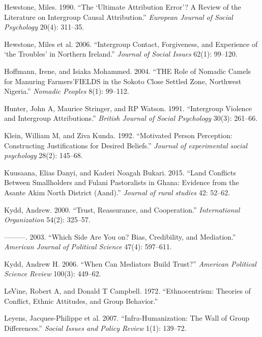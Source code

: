 \documentclass[11pt]{article}
\begin{document}
\leavevmode\hypertarget{ref-hewstone1990ultimate}{}%
Hewstone, Miles. 1990. ``The `Ultimate Attribution Error'? A Review of
the Literature on Intergroup Causal Attribution.'' \emph{European
Journal of Social Psychology} 20(4): 311--35.

\leavevmode\hypertarget{ref-hewstone2006intergroup}{}%
Hewstone, Miles et al. 2006. ``Intergroup Contact, Forgiveness, and
Experience of `the Troubles' in Northern Ireland.'' \emph{Journal of
Social Issues} 62(1): 99--120.

\leavevmode\hypertarget{ref-hoffmann2004role}{}%
Hoffmann, Irene, and Isiaka Mohammed. 2004. ``THE Role of Nomadic Camels
for Manuring Farmers'FIELDS in the Sokoto Close Settled Zone, Northwest
Nigeria.'' \emph{Nomadic Peoples} 8(1): 99--112.

\leavevmode\hypertarget{ref-hunter1991intergroup}{}%
Hunter, John A, Maurice Stringer, and RP Watson. 1991. ``Intergroup
Violence and Intergroup Attributions.'' \emph{British Journal of Social
Psychology} 30(3): 261--66.

\leavevmode\hypertarget{ref-klein1992motivated}{}%
Klein, William M, and Ziva Kunda. 1992. ``Motivated Person Perception:
Constructing Justifications for Desired Beliefs.'' \emph{Journal of
experimental social psychology} 28(2): 145--68.

\leavevmode\hypertarget{ref-kuusaana2015land}{}%
Kuusaana, Elias Danyi, and Kaderi Noagah Bukari. 2015. ``Land Conflicts
Between Smallholders and Fulani Pastoralists in Ghana: Evidence from the
Asante Akim North District (Aand).'' \emph{Journal of rural studies} 42:
52--62.

\leavevmode\hypertarget{ref-kydd2000trust}{}%
Kydd, Andrew. 2000. ``Trust, Reassurance, and Cooperation.''
\emph{International Organization} 54(2): 325--57.

\leavevmode\hypertarget{ref-kydd2003side}{}%
---------. 2003. ``Which Side Are You on? Bias, Credibility, and
Mediation.'' \emph{American Journal of Political Science} 47(4):
597--611.

\leavevmode\hypertarget{ref-kydd2006can}{}%
Kydd, Andrew H. 2006. ``When Can Mediators Build Trust?'' \emph{American
Political Science Review} 100(3): 449--62.

\leavevmode\hypertarget{ref-levine1972ethnocentrism}{}%
LeVine, Robert A, and Donald T Campbell. 1972. ``Ethnocentrism: Theories
of Conflict, Ethnic Attitudes, and Group Behavior.''

\leavevmode\hypertarget{ref-leyens2007infra}{}%
Leyens, Jacques-Philippe et al. 2007. ``Infra-Humanization: The Wall of
Group Differences.'' \emph{Social Issues and Policy Review} 1(1):
139--72.
\end{document}
